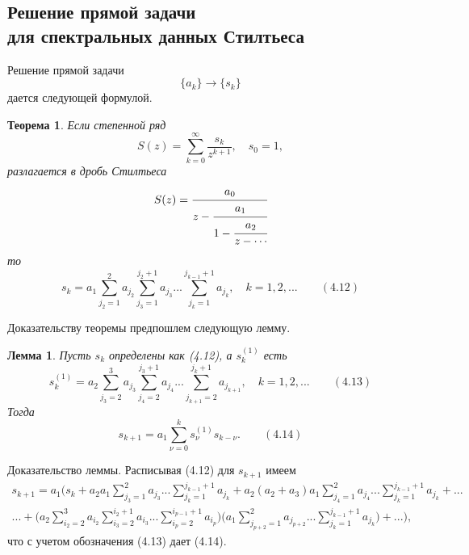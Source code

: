 \documentclass[12 pt, a4 paper]{article}
\theoremstyle{plain}   \newtheorem{Pro}{Задача}
\newtheorem{The}{Теорема}
\newtheorem{Lem}{Лемма}
\begin{document}
\subsection{Решение прямой задачи \\
для спектральных данных
Стилтьеса}
Решение прямой задачи
$$
  \{ a_k \} \longrightarrow \{ s_k \}
$$
дается следующей формулой.
\begin{The}
Если степенной ряд
$$
  S(z)=\sum _{k=0}^{\infty}
    \frac{s_k}{z^{k+1}}, \quad s_0 =1,
$$
разлагается в дробь Стилтьеса
\begin{equation*}
  S(z)=
    \cfrac{a_0}{z-
	  \cfrac{a_1}{1-
	    \cfrac{a_2}{z-\dotsb
	}}}
\end{equation*}
то
\begin{equation*}
  s_k =a_1 \sum _{j_2 =1}^2 a_{j_2}
    \sum _{j_3 =1}^{j_2 +1}a_{j_3}...
	  \sum _{j_k =1}^{j_{k-1}+1}a_{j_k},
	    \quad k=1,2,... \qquad (4.12)
\end{equation*}
\end{The}
Доказательству теоремы предпошлем следующую лемму.
\begin{Lem}
Пусть
$ s_k $
определены как (4.12), а
$ s_k ^{(1)} $
есть
\begin{equation*}
  s_k ^{(1)}=a_2 \sum _{j_3 =2}^3 a_{j_3}
    \sum _{j_4 =2}^{j_3 +1}a_{j_4}...
	  \sum _{j_{k+1}=2}^{j_k +1}a_{j_{k+1}},
	    \quad k=1,2,... \qquad (4.13)
\end{equation*}
Тогда
\begin{equation*}
  s_{k+1}=a_1 \sum _{\nu =0}^k s_{\nu}^{(1)}s_{k-\nu}.
  \qquad (4.14)
\end{equation*}
\end{Lem}
{\Large Доказательство леммы.}
Расписывая (4.12) для
$ s_{k+1} $
имеем
\begin{multline*}
  s_{k+1}=a_1 \Biggl (
    s_k +a_2 a_1
	  \sum _{j_3 =1}^2 a_{j_3}...
	    \sum _{j_k =1}^{j_{k-1}+1}a_{j_k}+
		  a_2 (a_2 +a_3 )a_1
		    \sum _{j_4 =1}^2 a_{j_4}...
			  \sum _{j_k =1}^{j_{k-1}+1}a_{j_k}+...\\
   ...+ \biggl ( a_2
     \sum _{i_2 =2}^3 a_{i_2}
	   \sum _{i_3 =2}^{i_2 +1}a_{i_3}...
	     \sum _{i_p =2}^{i_{p-1}+1}a_{i_p} \biggr )
		   \biggl ( a_1
		     \sum _{j_{p+2}=1}^2 a_{j_{p+2}}...
			   \sum _{j_k =1}^{j_{k-1}+1}a_{j_k} \biggr )+
			   ... \Biggr ),
\end{multline*}
что с учетом обозначения (4.13) дает (4.14).\\
\end{document}
